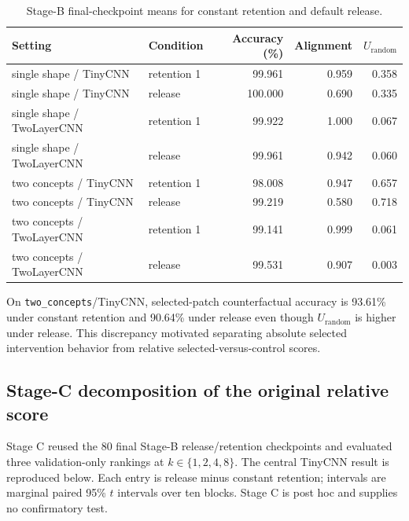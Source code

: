 \begin{table}[h]
\centering
\small
\begin{tabular}{llrrr}
\toprule
Setting & Condition & Accuracy (\%) & Alignment & $U_{\mathrm{random}}$ \\
\midrule
single shape / TinyCNN & retention 1 & 99.961 & 0.959 & 0.358 \\
single shape / TinyCNN & release & 100.000 & 0.690 & 0.335 \\
single shape / TwoLayerCNN & retention 1 & 99.922 & 1.000 & 0.067 \\
single shape / TwoLayerCNN & release & 99.961 & 0.942 & 0.060 \\
two concepts / TinyCNN & retention 1 & 98.008 & 0.947 & 0.657 \\
two concepts / TinyCNN & release & 99.219 & 0.580 & 0.718 \\
two concepts / TwoLayerCNN & retention 1 & 99.141 & 0.999 & 0.061 \\
two concepts / TwoLayerCNN & release & 99.531 & 0.907 & 0.003 \\
\bottomrule
\end{tabular}
\caption{Stage-B final-checkpoint means for constant retention and default release.}
\label{tab:stage-b-endpoints}
\end{table}

On \texttt{two\_concepts}/TinyCNN, selected-patch counterfactual accuracy is 93.61\% under constant retention and 90.64\% under release even though $U_{\mathrm{random}}$ is higher under release. This discrepancy motivated separating absolute selected intervention behavior from relative selected-versus-control scores.

\subsection{Stage-C decomposition of the original relative score}\label{app:stage-c-decomposition}

Stage C reused the 80 final Stage-B release/retention checkpoints and evaluated three validation-only rankings at $k\in\{1,2,4,8\}$. The central TinyCNN result is reproduced below. Each entry is release minus constant retention; intervals are marginal paired 95\% $t$ intervals over ten blocks. Stage C is post hoc and supplies no confirmatory test.

